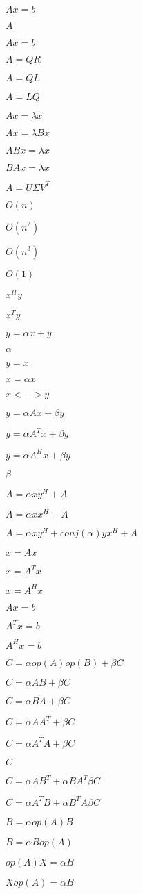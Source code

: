 \documentclass{article}
\begin{document}
$ Ax = b $
\pagebreak

$ A $
\pagebreak

$ Ax=b $
\pagebreak

$ A = QR $
\pagebreak

$ A = QL $
\pagebreak

$ A = LQ $
\pagebreak

$ Ax = \lambda x $
\pagebreak

$ Ax = \lambda Bx $
\pagebreak

$ ABx = \lambda x $
\pagebreak

$ BAx = \lambda x $
\pagebreak

$ A = U \Sigma V^T $
\pagebreak

$ O(n) $
\pagebreak

$ O(n^2) $
\pagebreak

$ O(n^3) $
\pagebreak

$ O(1) $
\pagebreak

$ x^H y $
\pagebreak

$ x^T y $
\pagebreak

$ y = \alpha x + y $
\pagebreak

$ \alpha $
\pagebreak

$ y = x $
\pagebreak

$ x = \alpha x $
\pagebreak

$ x <-> y $
\pagebreak

$ y = \alpha A x + \beta y $
\pagebreak

$ y = \alpha A^T x + \beta y $
\pagebreak

$ y = \alpha A^H x + \beta y $
\pagebreak

$ \beta $
\pagebreak

$ A = \alpha x y^H + A $
\pagebreak

$ A = \alpha x x^H + A $
\pagebreak

$ A = \alpha x y^H + conj(\alpha) y x^H + A $
\pagebreak

$ x = A x $
\pagebreak

$ x = A^T x $
\pagebreak

$ x = A^H x $
\pagebreak

$ A x = b $
\pagebreak

$ A^T x = b $
\pagebreak

$ A^H x = b $
\pagebreak

$ C = \alpha op(A) op(B) + \beta C $
\pagebreak

$ C = \alpha A B + \beta C $
\pagebreak

$ C = \alpha B A + \beta C $
\pagebreak

$ C = \alpha A A^T + \beta C $
\pagebreak

$ C = \alpha A^T A + \beta C $
\pagebreak

$ C $
\pagebreak

$ C = \alpha A B^T + \alpha B A^T \beta C $
\pagebreak

$ C = \alpha A^T B + \alpha B^T A \beta C $
\pagebreak

$ B = \alpha op(A) B $
\pagebreak

$ B = \alpha B op(A) $
\pagebreak

$ op(A) X = \alpha B $
\pagebreak

$ X op(A) = \alpha B $
\pagebreak
\end{document}

